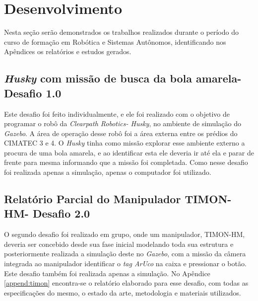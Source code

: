 \chapter{Desenvolvimento}
\label{chap:desenvolvimento}

Nesta seção serão demonstrados os trabalhos realizados durante o período do curso de formação em Robótica e Sistemas Autônomos, identificando nos Apêndices os relatórios e estudos gerados. 


\section{\textit{Husky} com missão de busca da bola amarela- Desafio 1.0 }
\label{sec:desafio_1}
Este desafio foi feito individualmente, e ele foi realizado com o objetivo de programar o robô da \textit{Clearpath Robotics- Husky}, no ambiente de simulação do \textit{Gazebo}. A área de operação desse robô foi a área externa entre os prédios do CIMATEC 3 e 4. O \textit{Husky} tinha como missão explorar esse ambiente externo a procura de uma bola amarela, e ao identificar esta ele deveria ir até ela e parar de frente para mesma informando que a missão foi completada. Como nesse desafio foi realizada apenas a simulação, apenas o computador foi utilizado.  




\section{Relatório Parcial do Manipulador TIMON-HM- Desafio 2.0 }
\label{sec:desafio_2}
O segundo desafio foi realizado em grupo, onde um manipulador, TIMON-HM, deveria ser concebido desde sua fase inicial modelando toda sua estrutura e posteriormente realizada a simulação deste no \textit{Gazebo}, com a missão da câmera integrada ao manipulador identificar o \textit{tag ArUco} na caixa e pressionar o botão. Este desafio também foi realizada apenas a simulação. No Apêndice \ref{append:timon} encontra-se o relatório elaborado para esse desafio, com todas as especificações do mesmo, o estado da arte, metodologia e materiais utilizados.

